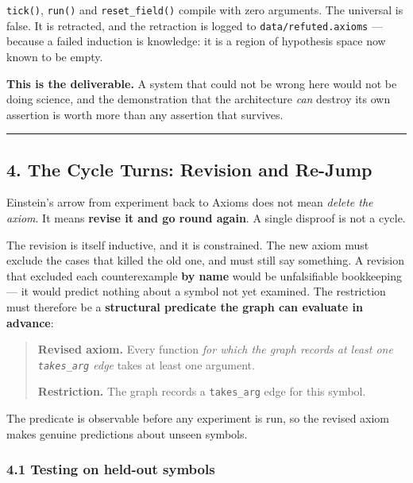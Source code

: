 \documentclass[
  11pt,
  a4paper,
]{article}
\begin{document}
\texttt{tick()}, \texttt{run()} and \texttt{reset\_field()} compile with
zero arguments. The universal is false. It is retracted, and the
retraction is logged to \texttt{data/refuted.axioms} --- because a
failed induction is knowledge: it is a region of hypothesis space now
known to be empty.

\textbf{This is the deliverable.} A system that could not be wrong here
would not be doing science, and the demonstration that the architecture
\emph{can} destroy its own assertion is worth more than any assertion
that survives.

\begin{center}\rule{0.5\linewidth}{0.5pt}\end{center}

\subsection{4. The Cycle Turns: Revision and
Re-Jump}\label{the-cycle-turns-revision-and-re-jump}

Einstein's arrow from experiment back to Axioms does not mean
\emph{delete the axiom}. It means \textbf{revise it and go round again}.
A single disproof is not a cycle.

The revision is itself inductive, and it is constrained. The new axiom
must exclude the cases that killed the old one, and must still say
something. A revision that excluded each counterexample \textbf{by name}
would be unfalsifiable bookkeeping --- it would predict nothing about a
symbol not yet examined. The restriction must therefore be a
\textbf{structural predicate the graph can evaluate in advance}:

\begin{quote}
\textbf{Revised axiom.} Every function \emph{for which the graph records
at least one \texttt{takes\_arg} edge} takes at least one argument.

\textbf{Restriction.} The graph records a \texttt{takes\_arg} edge for
this symbol.
\end{quote}

The predicate is observable before any experiment is run, so the revised
axiom makes genuine predictions about unseen symbols.

\subsubsection{4.1 Testing on held-out
symbols}\label{testing-on-held-out-symbols}
\end{document}
